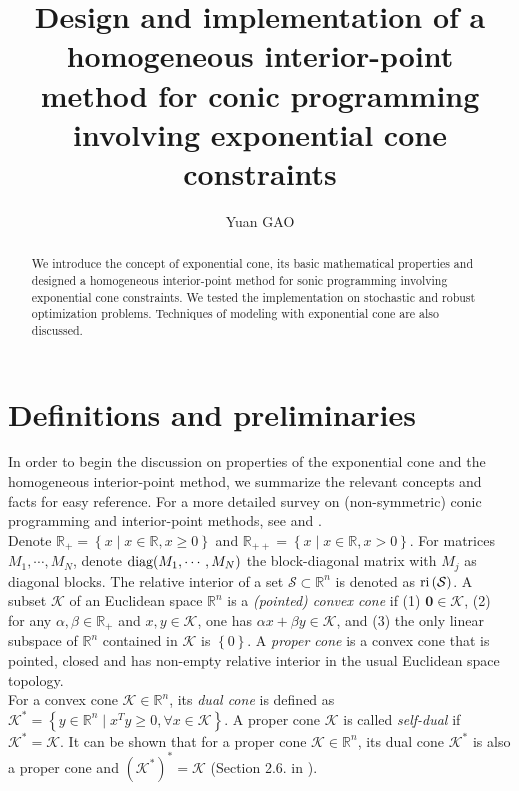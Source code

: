 \documentclass[10pt]{article}
\title{Design and implementation of a homogeneous interior-point method for conic programming involving exponential cone constraints}
\author{Yuan GAO}
\theoremstyle{definition}
\theoremstyle{plain}
\def\interior{\protect{\textnormal{ri}}}
\def\diagonal{\protect{\textnormal{diag}}}
\begin{document}
\maketitle

\begin{abstract}
We introduce the concept of exponential cone, its basic mathematical properties and designed a homogeneous interior-point method for sonic programming involving exponential cone constraints. We tested the implementation on stochastic and robust optimization problems. Techniques of modeling with exponential cone are also discussed.
\end{abstract}

\section{Definitions and preliminaries}
In order to begin the discussion on properties of the exponential cone and the homogeneous interior-point method, we summarize the relevant concepts and facts for easy reference. For a more detailed survey on (non-symmetric) conic programming and interior-point methods, see \cite{Robert_thesis} and \cite{Akle_thesis}.\\

Denote $\mathbb{R}_+ = \left\{x \mid x\in \mathbb{R}, x\geq 0\right\}$ and $\mathbb{R}_{++} = \left\{x \mid x\in \mathbb{R}, x> 0\right\}$. For matrices $M_1, \cdots, M_N$, denote $\diagonal(M_1, \cdots, M_N)$ the block-diagonal matrix with $M_j$ as diagonal blocks. The relative interior of a set $\mathcal{S} \subset \mathbb{R}^n$ is denoted as $\interior\left(\mathcal{S}\right)$. A subset $\mathcal{K}$ of an Euclidean space $\mathbb{R}^n$ is a \textit{(pointed) convex cone} if (1) $\mathbf{0} \in \mathcal{K}$, (2) for any $\alpha, \beta \in \mathbb{R}_+$ and $x,y \in \mathcal{K}$, one has $\alpha x + \beta y \in \mathcal{K}$, and (3) the only linear subspace of $\mathbb{R}^n$ contained in $\mathcal{K}$ is $\left\{0\right\}$. A \textit{proper cone} is a convex cone that is pointed, closed and has non-empty relative interior in the usual Euclidean space topology.\\

For a convex cone $\mathcal{K} \in \mathbb{R}^n$, its \textit{dual cone} is defined as 
$\mathcal{K}^* = \left\{y\in \mathbb{R}^n \mid x^T y\geq 0, \forall x \in \mathcal{K} \right\}$. A proper cone $\mathcal{K}$ is called \textit{self-dual} if $\mathcal{K}^* = \mathcal{K}$. It can be shown that for a proper cone $\mathcal{K} \in \mathbb{R}^n$, its dual cone $\mathcal{K}^*$ is also a proper cone and $(\mathcal{K}^*)^* = \mathcal{K}$ (Section 2.6. in \cite{Boyd_Vander_Convex_Opt_Book}). \\
\end{document}
